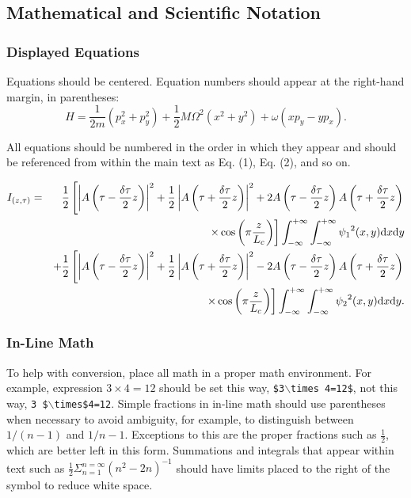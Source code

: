 \documentclass[letterpaper,12pt]{article}   %
\begin{document}
\subsection{Mathematical and Scientific Notation}
\subsubsection{Displayed Equations} Equations should be centered.
Equation numbers should appear at the right-hand margin, in
parentheses:
\begin{equation}
H = \frac{1}{2m}(p_x^2 + p_y^2) + \frac{1}{2} M{\Omega}^2
     (x^2 + y^2) + \omega (xp_y - yp_x).
\end{equation}

All equations should be numbered in the order in which they appear
and should be referenced  from within the main text as Eq. (1),
Eq. (2), and so on.

\begin{eqnarray}
I_{(z, \tau)} & = & \frac{1}{2} \left[ \left|
             A \left(\tau - \frac{\delta \tau}{2}z \right) \right|^2
           + \frac{1}{2} \left| A \left( \tau + \frac{\delta \tau}{2}z \right) \right|^2
           + 2A \left( \tau - \frac{\delta \tau}{2}z \right)
             A \left( \tau + \frac{\delta \tau}{2}z \right) \right. \nonumber \\
     & & \left. \times \cos \left( \pi \frac{z}{L_c} \right) \right]
             \int _{-\infty}^{+\infty}\int _{-\infty}^{+\infty}
             {\psi_1}^2(x,y){\rm d}x{\rm d}y  \nonumber \\
     & & + \frac{1}{2} \left[ \left| A \left(
           \tau - \frac{\delta \tau}{2}z \right) \right| ^2
           + \frac{1}{2} \left| A \left( \tau + \frac{\delta \tau}{2}z \right) \right| ^2
           - 2A \left( \tau - \frac{\delta \tau}{2}z \right)
              A \left( \tau + \frac{\delta \tau}{2}z \right) \right. \nonumber \\
     & & \left.  \times \cos \left( \pi \frac{z}{L_c} \right) \right]
           \int _{-\infty}^{+\infty}\int _{-\infty}^{+\infty}
           {\psi_2}^2(x,y){\rm d}x{\rm d}y.
\end{eqnarray}


\subsubsection{In-Line Math} To help with conversion, place all math in a proper math environment. For example, expression \mbox{$3\times 4 = 12$} should be set this way, \texttt{\$3$\backslash$times 4=12\$}, not this way, \texttt{3 \$$\backslash$times\$4=12}. Simple fractions in in-line math
should use parentheses when necessary to avoid ambiguity, for
example, to distinguish between $1/(n-1)$ and $1/n-1$.  Exceptions
to this are the proper fractions such as $\frac{1}{2}$, which are
better left in this form. Summations and integrals that appear
within text such as $\frac{1}{2}{\Sigma } _{n=1}^{n=\infty} (n^2 -
2n)^{-1}$ should have limits placed to the right of the symbol to
reduce white space.
\end{document}
